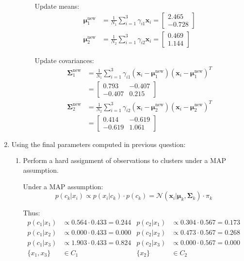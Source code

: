 \documentclass{article}
\begin{document}
\begin{enumerate}[leftmargin=\labelsep]
\begin{enumerate}
\begin{enumerate}
Update means:
\begin{align*}
\boldsymbol{\mu}_1^{\text{new}} &= \frac{1}{N_1}\sum_{i=1}^3 \gamma_{i1}\mathbf{x}_i = \begin{bmatrix} 2.465 \\ -0.728 \end{bmatrix} \\
\boldsymbol{\mu}_2^{\text{new}} &= \frac{1}{N_2}\sum_{i=1}^3 \gamma_{i2}\mathbf{x}_i = \begin{bmatrix} 0.469 \\ 1.144 \end{bmatrix}
\end{align*}

Update covariances:
\begin{align*}
\boldsymbol{\Sigma}_1^{\text{new}} &= \frac{1}{N_1}\sum_{i=1}^3 \gamma_{i1}(\mathbf{x}_i-\boldsymbol{\mu}_1^{\text{new}})(\mathbf{x}_i-\boldsymbol{\mu}_1^{\text{new}})^T \\
&= \begin{bmatrix} 0.793 & -0.407 \\ -0.407 & 0.215 \end{bmatrix} \\
\boldsymbol{\Sigma}_2^{\text{new}} &= \frac{1}{N_2}\sum_{i=1}^3 \gamma_{i2}(\mathbf{x}_i-\boldsymbol{\mu}_2^{\text{new}})(\mathbf{x}_i-\boldsymbol{\mu}_2^{\text{new}})^T \\
&= \begin{bmatrix} 0.414 & -0.619 \\ -0.619 & 1.061 \end{bmatrix}
\end{align*}

\end{enumerate}
\end{enumerate}


\item Using the final parameters computed in previous question:
\begin{enumerate}
\item Perform a hard assignment of observations to clusters under a MAP assumption.

Under a MAP assumption:
\begin{equation*}
  p(c_k|x_i) \propto p(x_i|c_k) \cdot p(c_k) = \mathcal{N}(\mathbf{x}_i|\boldsymbol{\mu}_k,\boldsymbol{\Sigma}_k) \cdot \pi_k
\end{equation*}

Thus:
\begin{align*}
p(c_1|x_1) &\propto 0.564 \cdot 0.433 = 0.244 &
p(c_2|x_1) &\propto 0.304 \cdot 0.567 = 0.173 \\
p(c_1|x_2) &\propto 0.000 \cdot 0.433 = 0.000 &
p(c_2|x_2) &\propto 0.473 \cdot 0.567 = 0.268 \\
p(c_1|x_3) &\propto 1.903 \cdot 0.433 = 0.824 &
p(c_2|x_3) &\propto 0.000 \cdot 0.567 = 0.000 \\
\{x_1, x_3\} &\in C_1 & \{x_2\} &\in C_2
\end{align*}
\newpage


\end{enumerate}
\end{enumerate}
\end{document}

